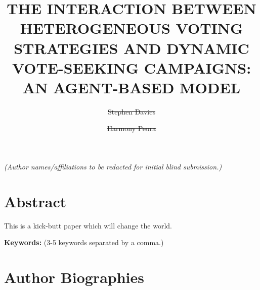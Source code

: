\documentclass{scspaperproc}
\begin{document}

\def\SCSconferencename{Annual Simulation Conference}

\def\SCSconferenceacro{ANNSIM'24}

\def\SCSpublicationyear{2024}

\def\SCSconferenceeditors{P.J. Giabbanelli, I. David, C. Ruiz-Martin, B. Oakes and R. C\'{a}rdenas}

\def\SCSconferencedates{May 20-23}

\def\SCSconferencevenue{American University, DC, USA}

\title{THE INTERACTION BETWEEN HETEROGENEOUS VOTING STRATEGIES AND DYNAMIC
VOTE-SEEKING CAMPAIGNS: AN AGENT-BASED MODEL}

\textit{(Author names/affiliations to be redacted for initial blind submission.)}
\author[\authorrefmark{1}]{\sout{Stephen Davies}}
\author[\authorrefmark{1}]{\sout{Harmony Peura}}



\maketitle

\section*{Abstract}

This is a kick-butt paper which will change the world.


\textbf{Keywords:} (3-5 keywords separated by a comma.)

















\section*{Author Biographies}
\end{document}
